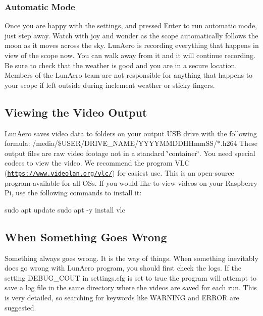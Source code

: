 \subsubsection*{Automatic Mode}

Once you are happy with the settings, and pressed {\ttfamily Enter} to run automatic mode, just step away. Watch with joy and wonder as the scope automatically follows the moon as it moves across the sky. Lun\+Aero is recording everything that happens in view of the scope now. You can walk away from it and it will continue recording. Be sure to check that the weather is good and you are in a secure location. Members of the Lun\+Aero team are not responsible for anything that happens to your scope if left outside during inclement weather or sticky fingers.

\subsection*{Viewing the Video Output}

Lun\+Aero saves video data to folders on your output U\+SB drive with the following formula\+: {\ttfamily /media/\$\+U\+S\+ER/\+D\+R\+I\+V\+E\+\_\+\+N\+A\+M\+E/\+Y\+Y\+Y\+Y\+M\+M\+D\+D\+H\+Hmm\+S\+S/$\ast$.h264} These output files are raw video footage not in a standard \char`\"{}container\char`\"{}. You need special codecs to view the video. We recommend the program V\+LC (\href{https://www.videolan.org/vlc/}{\tt https\+://www.\+videolan.\+org/vlc/}) for easiest use. This is an open-\/source program available for all OS\textquotesingle{}s. If you would like to view videos on your Raspberry Pi, use the following commands to install it\+:


\begin{DoxyCode}
sudo apt update
sudo apt -y install vlc
\end{DoxyCode}


\subsection*{When Something Goes Wrong}

Something always goes wrong. It is the way of things. When something inevitably does go wrong with Lun\+Aero program, you should first check the logs. If the setting {\ttfamily D\+E\+B\+U\+G\+\_\+\+C\+O\+UT} in {\ttfamily settings.\+cfg} is set to {\ttfamily true} the program will attempt to save a log file in the same directory where the videos are saved for each run. This is very detailed, so searching for keywords like {\ttfamily W\+A\+R\+N\+I\+NG} and {\ttfamily E\+R\+R\+OR} are suggested.

